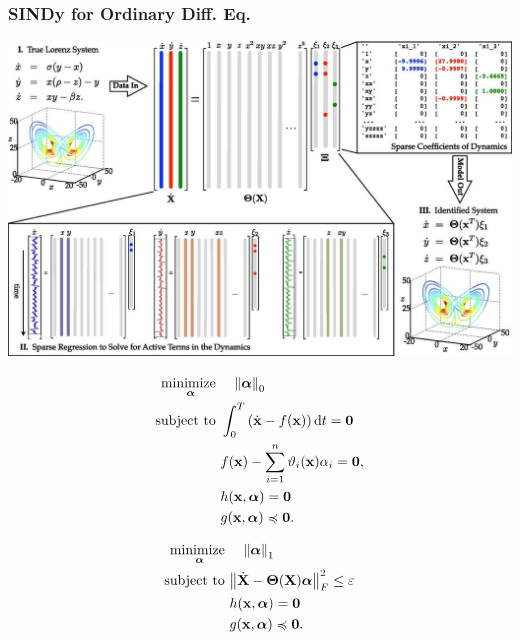 \documentclass[aspectratio=169,compress,12pt]{beamer}
\newcommand{\allzeros}{\ensuremath{\mathbf{0}}}
\DeclareMathOperator*{\minimize}{minimize~}
\DeclareMathOperator{\subto}{subject~to~}
\begin{document}
\begin{frame}
    \frametitle{SINDy for Ordinary Diff. Eq.}
    \vfill
    \centering
    \includegraphics[height=.8\textheight]{imgs/sindy_paper.png}
    \vfill
\end{frame}

\begin{frame}
    \vfill
    \[
    \begin{aligned}
        \minimize_{\boldsymbol{\alpha}} & \quad \norm{\boldsymbol{\alpha}}_0                                                                 \\
        \subto                          & \int_{0}^T \left( \dot{\vb{x}} - f(\vb{x}) \right) \dd t = \allzeros \\
                                        & f(\vb{x}) - \sum_{i=1}^n \vartheta_i(\vb{x}) \alpha_i = \allzeros, \\
                                        & h(\vb{x}, \boldsymbol{\alpha}) = \allzeros \\
                                        & g(\vb{x}, \boldsymbol{\alpha}) \preccurlyeq \allzeros.
    \end{aligned}
    \]
    \vfill
\end{frame}

\begin{frame}
    \vfill
    \[
    \begin{aligned}
        \minimize_{\boldsymbol{\alpha}} & \quad \norm{\boldsymbol{\alpha}}_1 \\
        \subto                          & \norm{\dot{\vb{X}} - \boldsymbol{\Theta}(\vb{X}) \boldsymbol{\alpha}}_F^2 \leq \varepsilon \\
                                        & h(\vb{x}, \boldsymbol{\alpha}) = \allzeros                                                         \\
                                        & g(\vb{x}, \boldsymbol{\alpha}) \preccurlyeq \allzeros.
    \end{aligned}
    \]
    \vfill
\end{frame}
\end{document}
